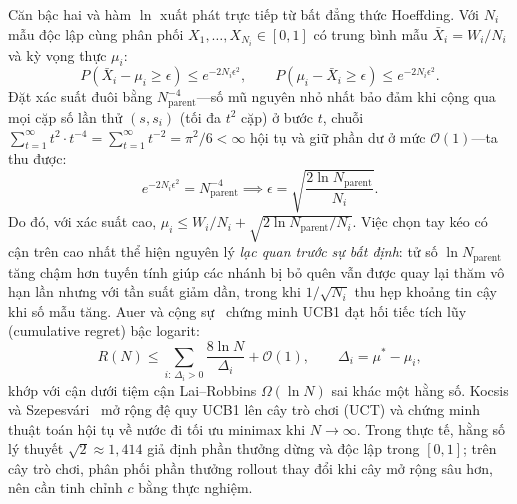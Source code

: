 \documentclass[conference]{IEEEtran}
\begin{document}
Căn bậc hai và hàm $\ln$ xuất phát trực tiếp từ bất đẳng thức Hoeffding. Với $N_i$ mẫu độc lập cùng phân phối $X_1, \dots, X_{N_i} \in [0, 1]$ có trung bình mẫu $\bar{X}_i = W_i / N_i$ và kỳ vọng thực $\mu_i$:
\begin{equation}
P(\bar{X}_i - \mu_i \ge \epsilon) \le e^{-2 N_i \epsilon^2}, \qquad
P(\mu_i - \bar{X}_i \ge \epsilon) \le e^{-2 N_i \epsilon^2}.
\end{equation}
Đặt xác suất đuôi bằng $N_{\mathrm{parent}}^{-4}$---số mũ nguyên nhỏ nhất bảo đảm khi cộng qua mọi cặp số lần thử $(s, s_i)$ (tối đa $t^2$ cặp) ở bước $t$, chuỗi $\sum_{t=1}^{\infty} t^2 \cdot t^{-4} = \sum_{t=1}^{\infty} t^{-2} = \pi^2/6 < \infty$ hội tụ và giữ phần dư ở mức $\mathcal{O}(1)$---ta thu được:
\begin{equation}
e^{-2 N_i \epsilon^2} = N_{\mathrm{parent}}^{-4} \implies \epsilon = \sqrt{\frac{2 \ln N_{\mathrm{parent}}}{N_i}}.
\end{equation}
Do đó, với xác suất cao, $\mu_i \le W_i/N_i + \sqrt{2 \ln N_{\mathrm{parent}} / N_i}$. Việc chọn tay kéo có cận trên cao nhất thể hiện nguyên lý \emph{lạc quan trước sự bất định}: tử số $\ln N_{\mathrm{parent}}$ tăng chậm hơn tuyến tính giúp các nhánh bị bỏ quên vẫn được quay lại thăm vô hạn lần nhưng với tần suất giảm dần, trong khi $1/\sqrt{N_i}$ thu hẹp khoảng tin cậy khi số mẫu tăng. Auer và cộng sự~\cite{auer2002} chứng minh UCB1 đạt hối tiếc tích lũy (cumulative regret) bậc logarit:
\begin{equation}
R(N) \le \sum_{i:\,\Delta_i > 0} \frac{8 \ln N}{\Delta_i} + \mathcal{O}(1), \qquad \Delta_i = \mu^* - \mu_i,
\end{equation}
khớp với cận dưới tiệm cận Lai--Robbins $\Omega(\ln N)$ sai khác một hằng số. Kocsis và Szepesvári~\cite{kocsis2006} mở rộng đệ quy UCB1 lên cây trò chơi (UCT) và chứng minh thuật toán hội tụ về nước đi tối ưu minimax khi $N \to \infty$. Trong thực tế, hằng số lý thuyết $\sqrt{2} \approx 1{,}414$ giả định phần thưởng dừng và độc lập trong $[0, 1]$; trên cây trò chơi, phân phối phần thưởng rollout thay đổi khi cây mở rộng sâu hơn, nên cần tinh chỉnh $c$ bằng thực nghiệm.
\end{document}
